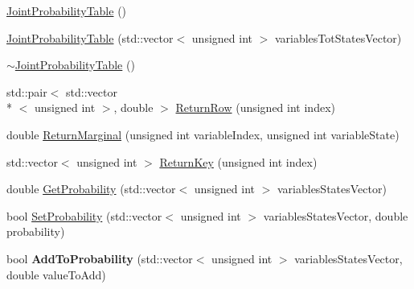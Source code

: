 \begin{DoxyCompactItemize}
\item 
\hyperlink{classbayonet_1_1_joint_probability_table_abc02930b72bf85bde3981e422e8676e0}{Joint\-Probability\-Table} ()
\item 
\hyperlink{classbayonet_1_1_joint_probability_table_afedab5cdff76623e341a9e8075a5867b}{Joint\-Probability\-Table} (std\-::vector$<$ unsigned int $>$ variables\-Tot\-States\-Vector)
\item 
\hyperlink{classbayonet_1_1_joint_probability_table_a5abe5ffb7ad2b6c4525e58b8ed6d7595}{$\sim$\-Joint\-Probability\-Table} ()
\item 
std\-::pair$<$ std\-::vector\\*
$<$ unsigned int $>$, double $>$ \hyperlink{classbayonet_1_1_joint_probability_table_abb4860d818ead54b75e08e6f84eff198}{Return\-Row} (unsigned int index)
\item 
double \hyperlink{classbayonet_1_1_joint_probability_table_a90538c4bf67f0270b705caa26fea742b}{Return\-Marginal} (unsigned int variable\-Index, unsigned int variable\-State)
\item 
std\-::vector$<$ unsigned int $>$ \hyperlink{classbayonet_1_1_joint_probability_table_a0bcd0ebffb4d8fd6403759c55de62f9b}{Return\-Key} (unsigned int index)
\item 
double \hyperlink{classbayonet_1_1_joint_probability_table_a6b43b8414444f81a8013d34837d191af}{Get\-Probability} (std\-::vector$<$ unsigned int $>$ variables\-States\-Vector)
\item 
bool \hyperlink{classbayonet_1_1_joint_probability_table_a69554f2b857ee778d2d2aff7cefa0d1e}{Set\-Probability} (std\-::vector$<$ unsigned int $>$ variables\-States\-Vector, double probability)
\item 
\hypertarget{classbayonet_1_1_joint_probability_table_a1968a96a22b64477b05f1118a6f8ac32}{bool {\bfseries Add\-To\-Probability} (std\-::vector$<$ unsigned int $>$ variables\-States\-Vector, double value\-To\-Add)}\label{classbayonet_1_1_joint_probability_table_a1968a96a22b64477b05f1118a6f8ac32}


\end{DoxyCompactItemize}

